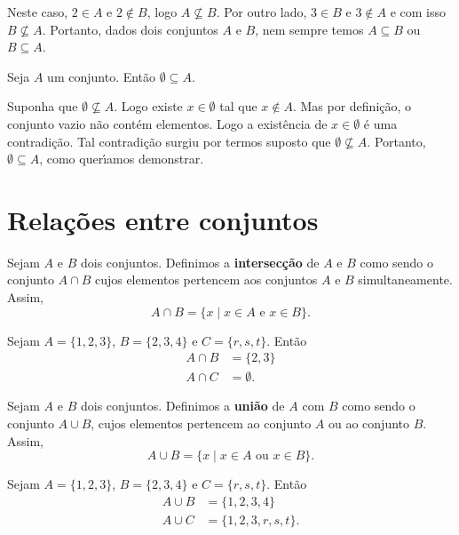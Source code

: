 Neste caso, $2 \in A$ e $2 \notin B$, logo $A \nsubseteq B$. Por outro lado, $3 \in B$ e $3 \notin A$ e com isso $B \nsubseteq A$. Portanto, dados dois conjuntos $A$ e $B$, nem sempre temos $A \subseteq B$ ou $B \subseteq A$.

\begin{proposicao} 
	Seja $A$ um conjunto. Ent{\~a}o $ \emptyset \subseteq A$.
\end{proposicao}
\begin{prova}
	Suponha que $\emptyset \nsubseteq A$. Logo existe $x \in \emptyset$ tal que $x \notin A$. Mas por defini{\c c}{\~a}o, o conjunto vazio n{\~a}o cont{\'e}m elementos. Logo a exist\^encia de $x \in \emptyset$ {\'e} uma contradi{\c c}{\~a}o. Tal contradi\c{c}\~ao surgiu por termos suposto que $\emptyset \nsubseteq A$. Portanto, $\emptyset \subseteq A$, como quer{\'\i}amos demonstrar.
\end{prova}

\section{Rela{\c c}{\~o}es entre conjuntos}

\begin{definicao}\label{intersecao_conjunto}
Sejam $A$ e $B$ dois conjuntos. Definimos a \textbf{intersec{\c c}{\~a}o} de $A$ e $B$ como sendo o conjunto $A \cap B$ cujos elementos pertencem aos conjuntos $A$ e $B$ simultaneamente. Assim,
\[
A \cap B = \{x \mid x \in A\mbox{ e }  x \in B\}.
\]
\end{definicao}

\begin{exemplo}
	Sejam $A = \{1, 2, 3\}$, $B = \{2, 3, 4\}$ e $C = \{r, s, t\}$. Ent\~ao
	\begin{align*}
		A \cap B &= \{2, 3\}\\
		A \cap C &= \emptyset.
	\end{align*}
\end{exemplo}

\begin{definicao}\label{unicao_conjuntos}
Sejam $A$ e $B$ dois conjuntos. Definimos a \textbf{uni{\~a}o} de $A$ com $B$ como sendo o conjunto $A \cup B$, cujos elementos pertencem ao conjunto $A$ ou ao conjunto $B$. Assim,
\[
A \cup B = \{x \mid x \in A \mbox{ ou } x \in B\}.
\]
\end{definicao}

\begin{exemplo}
	Sejam $A = \{1, 2, 3\}$, $B = \{2, 3, 4\}$ e $C = \{r, s, t\}$. Ent\~ao
	\begin{align*}
		A \cup B &= \{1,2,3,4\}\\
		A \cup C &= \{1,2,3,r,s,t\}.
	\end{align*}
\end{exemplo}

